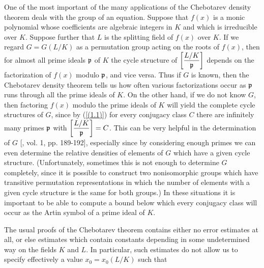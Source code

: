\documentclass[./main]{subfiles}
\begin{document}
One of the most important of the many applications of the Chebotarev density theorem deals with the group of an equation. Suppose that $f(x)$ is a monic polynomial whose coefficients are algebraic integers in $K$ and which is irreducible over $K$. Suppose further that $L$ is the splitting field of $f(x)$ over $K$. If we regard $G = G(L/K)$ as a permutation group acting on the roots of $f(x)$, then for almost all prime ideals $\mathfrak{p}$ of $K$ the cycle structure of $\bigg[\dfrac{L/K}{\mathfrak{p}}\bigg]$ depends on the factorization of $f(x)$ modulo $\mathfrak{p}$, and vice versa. Thus if $G$ is known, then the Chebotarev density theorem tells us how often various factorizations occur as $\mathfrak{p}$ runs through all the prime ideals of $K$. On the other hand, if we do not know $G$, then factoring $f(x)$ modulo the prime ideals of $K$ will yield the complete cycle structures of $G$, since by (\ref{(1.1)}) for every conjugacy class $C$ there are infinitely many primes $\mathfrak{p}$ with $\bigg[\dfrac{L/K}{\mathfrak{p}}\bigg] = C$. This can be very helpful in the determination of $G$ [\cite{16-waerden1970}, vol. 1, pp. 189-192], especially since by considering enough primes we can even determine the relative densities of elements of $G$ which have a given  cycle structure. (Unfortunately, sometimes this is not enough to determine $G$ completely, since it is possible to construct two nonisomorphic groups which have transitive permutation representations in which the number of elements with a given cycle structure is the same for both groups.) In these situations it is important to be able to compute a bound below which every conjugacy class will occur as the Artin symbol of a prime ideal of $K$.

The usual proofs of the Chebotarev theorem contains either no error estimates at all, or else estimates which contain constants depending in some undetermined way on the fields $K$ and $L$. In particular, such estimates do not allow us to specify effectively a value $x_0 = x_0(L/K)$ such that
\end{document}
